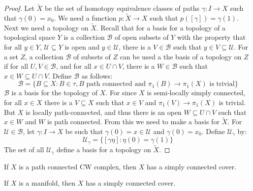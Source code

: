    \begin{proof}
        Let $\tilde{X}$ be the set of homotopy equivalence
        classes of paths $\gamma:I\rightarrow{X}$ such that
        $\gamma(0)=x_{0}$. We need a function
        $p:\tilde{X}\rightarrow{X}$ such that
        $p([\gamma])=\gamma(1)$. Next we need a topology
        on $\tilde{X}$. Recall that for a basis for a topology
        of a topological space $Y$ is a collection
        $\mathcal{B}$ of open subsets of $Y$ with the property
        that for all $y\in{Y}$, $\mathcal{U}\subseteq{Y}$ is
        open and $y\in\mathcal{U}$, there is a $V\in\mathcal{B}$
        such that $y\in{V}\subseteq\mathcal{U}$. For a set
        $Z$, a collection $\mathcal{B}$ of subsets of $Z$
        can be used a the basis of a topology on $Z$ if
        for all $U,V\in\mathcal{B}$, and for all
        $x\in{U}\cap{V}$, there is a $W\in\mathcal{B}$ such
        that $x\in{W}\subseteq{U}\cap{V}$. Define
        $\mathcal{B}$ as follows:
        \begin{equation}
            \mathcal{B}=\{B\subseteq{X}:B\in\tau,
                B\textrm{ path connected and }
                \pi_{1}(B)\rightarrow\pi_{1}(X)
                \textrm{ is trivial}\}
        \end{equation}
        $\mathcal{B}$ is a basis for the topology of
        $X$. For since $X$ is semi-locally simply connected,
        for all $x\in{X}$ there is a $V\subseteq{X}$ such
        that $x\in{V}$ and
        $\pi_{1}(V)\rightarrow\pi_{1}(X)$ is trivial. But
        $X$ is locally path-connected, and thus there is an
        open $W\subseteq{U}\cap{V}$ such that $x\in{W}$ and
        $W$ is path connected. From this we need to make a basis
        for $\tilde{X}$. For $\mathcal{U}\in\mathcal{B}$,
        let $\gamma:I\rightarrow{X}$ be such that
        $\gamma(0)=x\in\mathcal{U}$ and $\gamma(0)=x_{0}$.
        Define $\mathcal{U}_{\gamma}$ by:
        \begin{equation}
            \mathcal{U}_{\gamma}=\{
                [\gamma\eta]:\eta(0)=\gamma(1)\}
        \end{equation}
        The set of all $\mathcal{U}_{\gamma}$ define a basis
        for a topology on $\tilde{X}$.
    \end{proof}
    \begin{theorem}
        If $X$ is a path connected CW complex, then
        $X$ has a simply connected cover.
    \end{theorem}
    \begin{theorem}
        If $X$ is a manifold, then $X$ has a simply
        connected cover.
    \end{theorem}

